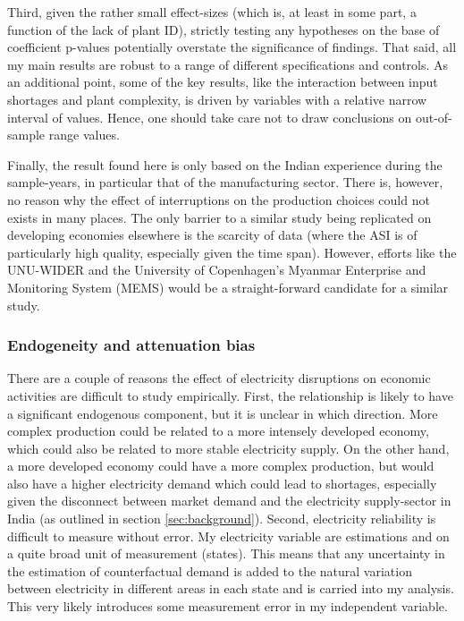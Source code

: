 \documentclass[11pt]{article}
\begin{document}
Third, given the rather small effect-sizes (which is, at least in some part, a function of the lack of plant ID), strictly testing any hypotheses on the base of coefficient p-values potentially overstate the significance of findings. That said, all my main results are robust to a range of different specifications and controls. As an additional point, some of the key results, like the interaction between input shortages and plant complexity, is driven by variables with a relative narrow interval of values. Hence, one should take care not to draw conclusions on out-of-sample range values. 

Finally, the result found here is only based on the Indian experience during the sample-years, in particular that of the manufacturing sector. There is, however, no reason why the effect of interruptions on the production choices could not exists in many places. The only barrier to a similar study being replicated on developing economies elsewhere is the scarcity of data (where the ASI is of particularly high quality, especially given the time span). However, efforts like the UNU-WIDER and the University of Copenhagen's Myanmar Enterprise and Monitoring System (MEMS) would be a straight-forward candidate for a similar study.

\subsubsection{Endogeneity and attenuation bias}
\label{sec:orgd4457e7}
There are a couple of reasons the effect of electricity disruptions on economic activities are difficult to study empirically. First, the relationship is likely to have a significant endogenous component, but it is unclear in which direction. More complex production could be related to a more intensely developed economy, which could also be related to more stable electricity supply. On the other hand, a more developed economy could have a more complex production, but would also have a higher electricity demand which could lead to shortages, especially given the disconnect between market demand and the electricity supply-sector in India (as outlined in section \ref{sec:background}). Second, electricity reliability is difficult to measure without error. My electricity variable are estimations and on a quite broad unit of measurement (states). This means that any uncertainty in the estimation of counterfactual demand is added to the natural variation between electricity in different areas in each state and is carried into my analysis. This very likely introduces some measurement error in my independent variable.
\end{document}
